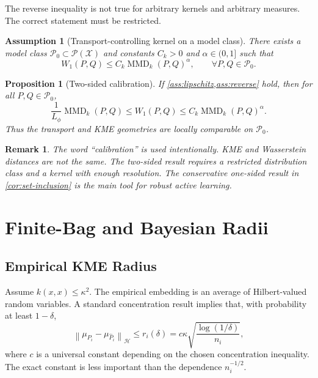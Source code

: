 \documentclass[10pt,journal]{IEEEtran}
\newtheorem{assumption}{Assumption}
\newtheorem{proposition}{Proposition}
\newtheorem{remark}{Remark}
\DeclareMathOperator{\MMD}{MMD}
\newcommand{\Pcal}{\mathcal{P}}
\newcommand{\Xcal}{\mathcal{X}}
\newcommand{\Hcal}{\mathcal{H}}
\newcommand{\wh}{\widehat}
\newcommand{\norm}[1]{\left\lVert #1 \right\rVert}
\begin{document}
The reverse inequality is not true for arbitrary kernels and arbitrary measures. The correct statement must be restricted.

\begin{assumption}[Transport-controlling kernel on a model class]
\label{ass:reverse}
There exists a model class $\Pcal_0\subset\Pcal(\Xcal)$ and constants $C_k>0$ and $\alpha\in(0,1]$ such that
\begin{equation}
\label{eq:reverse}
    W_1(P,Q)\le C_k \MMD_k(P,Q)^\alpha,
    \qquad \forall P,Q\in\Pcal_0.
\end{equation}
\end{assumption}

\begin{proposition}[Two-sided calibration]
\label{prop:two-sided}
If \cref{ass:lipschitz,ass:reverse} hold, then for all $P,Q\in\Pcal_0$,
\begin{equation}
    \frac{1}{L_\phi}\MMD_k(P,Q)\le W_1(P,Q)\le C_k \MMD_k(P,Q)^\alpha.
\end{equation}
Thus the transport and KME geometries are locally comparable on $\Pcal_0$.
\end{proposition}

\begin{remark}
The word ``calibration'' is used intentionally. KME and Wasserstein distances are not the same. The two-sided result requires a restricted distribution class and a kernel with enough resolution. The conservative one-sided result in \cref{cor:set-inclusion} is the main tool for robust active learning.
\end{remark}

\section{Finite-Bag and Bayesian Radii}
\label{sec:radii}

\subsection{Empirical KME Radius}

Assume $k(x,x)\le \kappa^2$. The empirical embedding is an average of Hilbert-valued random variables. A standard concentration result implies that, with probability at least $1-\delta$,
\begin{equation}
\label{eq:kme-concentration}
    \norm{\mu_{P_i}-\mu_{\wh P_i}}_{\Hcal}\le r_i(\delta)
    = c\kappa\sqrt{\frac{\log(1/\delta)}{n_i}},
\end{equation}
where $c$ is a universal constant depending on the chosen concentration inequality. The exact constant is less important than the dependence $n_i^{-1/2}$.
\end{document}
